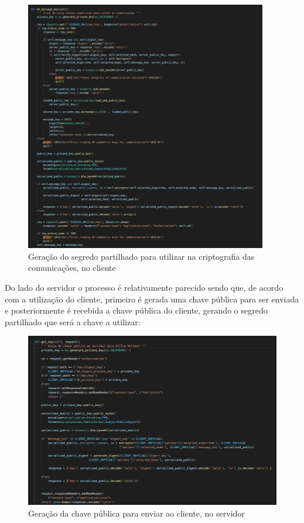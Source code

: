 \documentclass[10pt,english]{article}
\begin{document}
\begin{figure}[!h]
        \centering
        \includegraphics[width=400]{images/dh_message_client.png}
        \caption{Geração do segredo partilhado para utilizar na criptografia das comunicações, no cliente}
\end{figure}

\clearpage

\par Do lado do servidor o processo é relativamente parecido sendo que, de acordo com a utilização do cliente, primeiro é gerada uma chave pública para ser enviada e posteriormente é recebida a chave pública do cliente, gerando o segredo partilhado que será a chave a utilizar:

\begin{figure}[!h]
        \centering
        \includegraphics[width=\textwidth]{images/dh_send_server.png}
        \caption{Geração da chave pública para enviar ao cliente, no servidor}
\end{figure}
\end{document}
